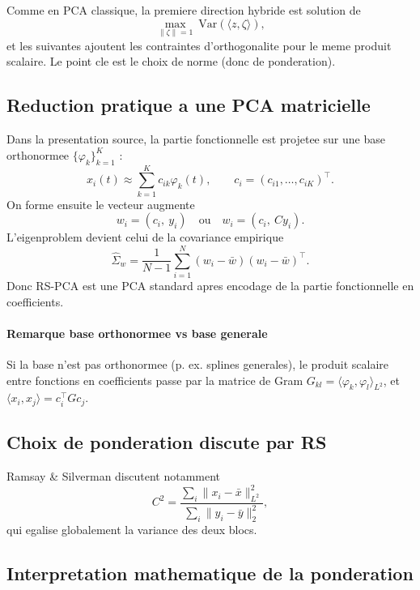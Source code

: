 \documentclass[11pt,a4paper]{article}
\begin{document}
Comme en PCA classique, la premiere direction hybride est solution de
\[
\max_{\|\zeta\|=1}\ \mathrm{Var}(\langle z,\zeta\rangle),
\]
et les suivantes ajoutent les contraintes d'orthogonalite pour le meme produit
scalaire. Le point cle est le choix de norme (donc de ponderation).

\subsection{Reduction pratique a une PCA matricielle}

Dans la presentation source, la partie fonctionnelle est projetee sur une base
orthonormee $\{\varphi_k\}_{k=1}^K$ :
\[
x_i(t)\approx \sum_{k=1}^K c_{ik}\varphi_k(t),\qquad
c_i=(c_{i1},\dots,c_{iK})^\top.
\]
On forme ensuite le vecteur augmente
\[
w_i=(c_i,\ y_i)\quad\text{ou}\quad w_i=(c_i,\ C y_i).
\]
L'eigenproblem devient celui de la covariance empirique
\begin{equation}
\widehat{\Sigma}_w=\frac{1}{N-1}\sum_{i=1}^N
(w_i-\bar{w})(w_i-\bar{w})^\top.
\label{eq:rs-cov}
\end{equation}
Donc RS-PCA est une PCA standard apres encodage de la partie fonctionnelle en
coefficients.

\paragraph{Remarque base orthonormee vs base generale}
Si la base n'est pas orthonormee (p. ex. splines generales), le produit
scalaire entre fonctions en coefficients passe par la matrice de Gram
$G_{kl}=\langle \varphi_k,\varphi_l\rangle_{L^2}$, et
$\langle x_i,x_j\rangle=c_i^\top G c_j$.

\subsection{Choix de ponderation discute par RS}

Ramsay \& Silverman discutent notamment
\begin{equation}
C^2=
\frac{\sum_i\|x_i-\bar{x}\|_{L^2}^2}{\sum_i\|y_i-\bar{y}\|_2^2},
\label{eq:rs-c2}
\end{equation}
qui egalise globalement la variance des deux blocs.

\subsection{Interpretation mathematique de la ponderation}
\end{document}
